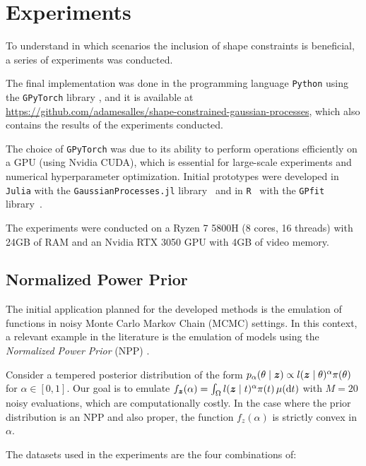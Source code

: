 \section{Experiments}

To understand in which scenarios the inclusion of shape constraints is beneficial, a series of experiments was conducted.

The final implementation was done in the programming language \texttt{Python} using the \texttt{GPyTorch} library \citep{Gardner2021}, and it is available at \url{https://github.com/adamesalles/shape-constrained-gaussian-processes}, which also contains the results of the experiments conducted.

The choice of \texttt{GPyTorch} was due to its ability to perform operations efficiently on a GPU (using Nvidia CUDA), which is essential for large-scale experiments and numerical hyperparameter optimization. Initial prototypes were developed in \texttt{Julia} with the \texttt{GaussianProcesses.jl} library~\citep{Fairbrother2022} and in \texttt{R}~\cite{R} with the \texttt{GPfit} library~\citep{GPfit2015}.

The experiments were conducted on a Ryzen 7 5800H (8 cores, 16 threads) with 24GB of RAM and an Nvidia RTX 3050 GPU with 4GB of video memory.

\subsection{Normalized Power Prior}

The initial application planned for the developed methods is the emulation of functions in noisy Monte Carlo Markov Chain (MCMC) settings.
In this context, a relevant example in the literature is the emulation of models using the \textit{Normalized Power Prior} (NPP) \citep{Carvalho2021}.


Consider a tempered posterior distribution of the form \( p_{\alpha}(\theta \mid \boldsymbol{z}) \propto l(\boldsymbol{z} \mid \theta)^\alpha\pi(\theta) \) for \( \alpha \in [0, 1] \).
Our goal is to emulate \( f_{\boldsymbol{z}}(\alpha) = \int_{\Omega}l(\boldsymbol{z} \mid t)^\alpha\pi(t)\, \mu(\mathrm{d}t) \) with \( M = 20 \) noisy evaluations, which are computationally costly.
In the case where the prior distribution is an NPP and also proper, the function \( f_{z}(\alpha) \) is strictly convex in \( \alpha \).

The datasets used in the experiments are the four combinations of:

